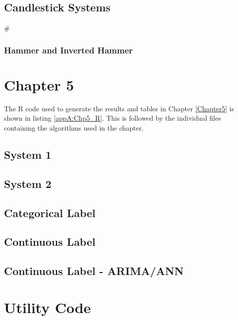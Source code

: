 
\label{appA:bout_Quant90}

\subsection{Candlestick Systems}
#\subsubsection{Hammer and Inverted Hammer}


\label{appA:Hammer}


\label{appA:Hammer_aroon}


\label{appA:Engulf}


\label{appA:Engulf_aroon}


\label{appA:Doji_aroon}

\section{Chapter 5}
The R code used to generate the results and tables in Chapter \ref{Chapter5} is shown in listing \ref{appA:Chp5_R}. This is followed by the individual files containing the algorithms used in the chapter.


\label{appA:Chp5_R}

\subsection{System 1}

\label{appA:ts_1}

\subsection{System 2}

\label{appA:ts_2}

\subsection{Categorical Label}

\label{appA:ts_4}

\subsection{Continuous Label}

\label{appA:ts_3}

\subsection{Continuous Label - ARIMA/ANN}

\label{appA:ts_3a}

\section{Utility Code}
\label{appA:utility}

